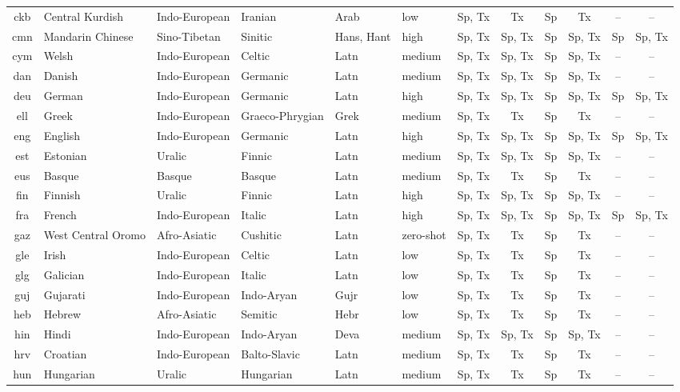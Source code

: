 \begin{table}[!p]
\begin{tabular}{clHHllcccccc}
ckb & Central Kurdish & Indo-European & Iranian & Arab & low & Sp, Tx & Tx & Sp & Tx & -- & -- \\
cmn & Mandarin Chinese & Sino-Tibetan & Sinitic & Hans, Hant & high & Sp, Tx & Sp, Tx  & Sp & Sp, Tx & Sp & Sp, Tx \\
cym & Welsh & Indo-European & Celtic & Latn & medium & Sp, Tx & Sp, Tx  & Sp & Sp, Tx & -- & -- \\
dan & Danish & Indo-European & Germanic & Latn & medium & Sp, Tx & Sp, Tx  & Sp & Sp, Tx & -- & -- \\
deu & German & Indo-European & Germanic & Latn & high & Sp, Tx & Sp, Tx  & Sp & Sp, Tx & Sp & Sp, Tx \\
ell & Greek & Indo-European & Graeco-Phrygian & Grek & medium & Sp, Tx & Tx & Sp & Tx & -- & -- \\
eng & English & Indo-European & Germanic & Latn & high & Sp, Tx & Sp, Tx  & Sp & Sp, Tx & Sp & Sp, Tx \\
est & Estonian & Uralic & Finnic & Latn & medium & Sp, Tx & Sp, Tx  & Sp & Sp, Tx & -- & -- \\
eus & Basque & Basque & Basque & Latn & medium & Sp, Tx & Tx & Sp & Tx & -- & -- \\
fin & Finnish & Uralic & Finnic & Latn & high & Sp, Tx & Sp, Tx  & Sp & Sp, Tx & -- & -- \\
fra & French & Indo-European & Italic & Latn & high & Sp, Tx & Sp, Tx  & Sp & Sp, Tx & Sp & Sp, Tx \\
gaz & West Central Oromo & Afro-Asiatic & Cushitic & Latn & zero-shot & Sp, Tx & Tx & Sp & Tx & -- & -- \\
gle & Irish & Indo-European & Celtic & Latn & low & Sp, Tx & Tx & Sp & Tx & -- & -- \\
glg & Galician & Indo-European & Italic & Latn & low & Sp, Tx & Tx & Sp & Tx & -- & -- \\
guj & Gujarati & Indo-European & Indo-Aryan & Gujr & low & Sp, Tx & Tx & Sp & Tx & -- & -- \\
heb & Hebrew & Afro-Asiatic & Semitic & Hebr & low & Sp, Tx & Tx & Sp & Tx & -- & -- \\
hin & Hindi & Indo-European & Indo-Aryan & Deva & medium & Sp, Tx & Sp, Tx  & Sp & Sp, Tx & -- & -- \\
hrv & Croatian & Indo-European & Balto-Slavic & Latn & medium & Sp, Tx & Tx & Sp & Tx & -- & -- \\
hun & Hungarian & Uralic & Hungarian & Latn & medium & Sp, Tx & Tx & Sp & Tx & -- & -- \\

\end{tabular}
\end{table}
